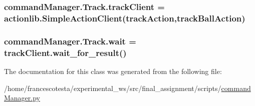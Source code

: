 \subsubsection[{\texorpdfstring{track\+Client}{trackClient}}]{\setlength{\rightskip}{0pt plus 5cm}command\+Manager.\+Track.\+track\+Client = actionlib.\+Simple\+Action\+Client(\textquotesingle{}track\+Action\textquotesingle{},track\+Ball\+Action)\hspace{0.3cm}{\ttfamily [static]}}\hypertarget{classcommandManager_1_1Track_a4a57e4e548d9213c4623f5d528753b1f}{}\label{classcommandManager_1_1Track_a4a57e4e548d9213c4623f5d528753b1f}
\subsubsection[{\texorpdfstring{wait}{wait}}]{\setlength{\rightskip}{0pt plus 5cm}command\+Manager.\+Track.\+wait = track\+Client.\+wait\+\_\+for\+\_\+result()\hspace{0.3cm}{\ttfamily [static]}}\hypertarget{classcommandManager_1_1Track_a8f86bbb5fd3d92749c09d5e876a1d1a6}{}\label{classcommandManager_1_1Track_a8f86bbb5fd3d92749c09d5e876a1d1a6}


The documentation for this class was generated from the following file\+:\begin{DoxyCompactItemize}
\item 
/home/francescotesta/experimental\+\_\+ws/src/final\+\_\+assignment/scripts/\hyperlink{commandManager_8py}{command\+Manager.\+py}\end{DoxyCompactItemize}
